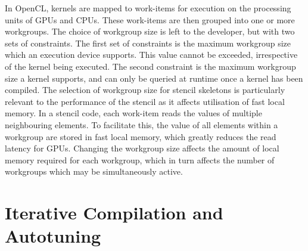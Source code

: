 In OpenCL, kernels are mapped to work-items for execution on the
processing units of GPUs and CPUs. These work-items are then grouped
into one or more workgroups. The choice of workgroup size is left to
the developer, but with two sets of constraints. The first set of
constraints is the maximum workgroup size which an execution device
supports. This value cannot be exceeded, irrespective of the kernel
being executed. The second constraint is the maximum workgroup size a
kernel supports, and can only be queried at runtime once a kernel has
been compiled. The selection of workgroup size for stencil skeletons
is particularly relevant to the performance of the stencil as it
affects utilisation of fast local memory. In a stencil code, each
work-item reads the values of multiple neighbouring elements. To
facilitate this, the value of all elements within a workgroup are
stored in fast local memory, which greatly reduces the read latency
for GPUs. Changing the workgroup size affects the amount of local
memory required for each workgroup, which in turn affects the number
of workgroups which may be simultaneously active.


\section{Iterative Compilation and Autotuning}



%
%

